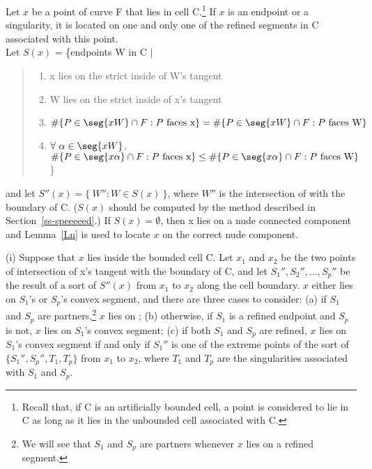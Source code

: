 \newpage

\begin{theorem}
\label{Tps}
Let $x$ be a point of curve F that lies in cell C.\footnote{Recall that, 
	if C is an artificially bounded cell,
	a point is considered to lie in C as long as it lies in the unbounded cell
	associated with C.}
If $x$ is an endpoint or a singularity,
it is located on one and only one of the refined segments in C associated with this point.\\
Let $S(x)$ = \{endpoints W in C $\mid$
\begin{quote}
\begin{enumerate}
\item x lies on the strict inside of W's tangent
\item W lies on the strict inside of x's tangent 
\item \mbox{$\#\{P \in\seg{xW}\cap F: P \mbox{ faces x}\} =
\#\{P \in \seg{xW}\cap F: P \mbox{ faces W} \}$}
\item $\forall\ \alpha \in \seg{xW}$,
$\#\{P \in\seg{x\alpha}\cap F: P \mbox{ faces x}\} \leq
\#\{P \in \seg{x\alpha}\cap F: P \mbox{ faces W}\} $
\}
\end{enumerate}
\end{quote}
%
and let $S''(x) = \{\ W'' : W \in S(x)\ \}$, where $W''$ is the intersection 
of  with the boundary of C.
($S(x)$ should be computed by the method described in Section~\ref{ss-speeeeed}.)
If $S(x) = \emptyset$, then x lies on a nude connected component and Lemma~\ref{Ln}
is used to locate $x$ on the correct nude component.

(i) Suppose that $x$ lies inside the bounded cell C.
Let $x_{1}$ and $x_{2}$ be the two points of intersection of x's tangent with the
boundary of C, and let $S_{1}'',S_{2}'',\ldots,S_{p}''$ be the result of a sort of $S''(x)$ 
from $x_{1}$ to $x_{2}$ along the cell boundary.
$x$ either lies on $S_{1}$'s or $S_{p}$'s convex segment,
% 
%
and there are three cases to consider:
(a) if $S_{1}$ and $S_{p}$ are partners,\footnote{We will see that $S_{1}$ and $S_{p}$ 
	are partners whenever $x$ lies on a refined segment.}
$x$ lies on ;
(b) otherwise, if $S_{1}$ is a refined endpoint and 
$S_{p}$ is not, $x$ lies on $S_{1}$'s convex segment;
(c) if both $S_{1}$ and $S_{p}$ are refined,
$x$ lies on $S_{1}$'s convex segment if and only if 
$S_{1}''$ is one of the extreme points of the sort
of $\{S_{1}'',S_{p}'',T_{1},T_{p}\}$ from $x_{1}$ to $x_{2}$, where
$T_{1}$ and $T_{p}$ are the singularities
associated with $S_{1}$ and $S_{p}$.


\end{theorem}
